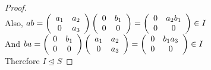 \documentclass{article} %
\begin{document}
\begin{addmargin}[1em]{0em}
\begin{addmargin}[1em]{0em}
\begin{proof}
\\Also, $ab = \left( \begin{array}{c c} a_1& a_2 \\ 0 & a_3 \end{array} \right) \left( \begin{array}{c c} 0& b_1 \\ 0 & 0 \end{array} \right) = \left( \begin{array}{c c} 0& a_2b_1\\ 0 & 0 \end{array} \right) \in I$
\\And $ba =  \left( \begin{array}{c c} 0& b_1 \\ 0 & 0 \end{array} \right) \left( \begin{array}{c c} a_1& a_2 \\ 0 & a_3 \end{array} \right) = \left( \begin{array}{c c} 0& b_1a_3\\ 0 & 0 \end{array} \right) \in I$
\\Therefore $I \unlhd S$
\end{proof}
\end{addmargin}
\end{addmargin}
\end{document}
